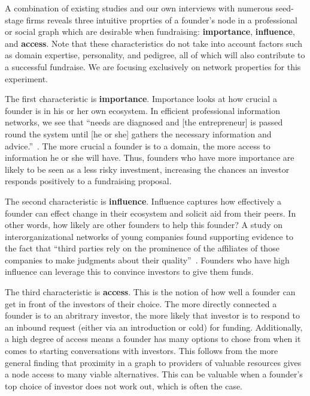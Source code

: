 A combination of existing studies and our own interviews with numerous seed-stage firms reveals three intuitive proprties of a founder's node in a professional or social graph which are desirable when fundraising: \textbf{importance}, \textbf{influence}, and \textbf{access}. Note that these characteristics do not take into account factors such as domain expertise, personality, and pedigree, all of which will also contribute to a successful fundraise. We are focusing exclusively on network properties for this experiment.

The first characteristic is \textbf{importance}. Importance looks at how crucial a founder is in his or her own ecosystem. In efficient professional information networks, we see that ``needs are diagnosed and [the entrepreneur] is passed round the system until [he or she] gathers the necessary information and advice.''~\cite{BIRLEY1985107}. The more crucial a founder is to a domain, the more access to information he or she will have. Thus, founders who have more importance are likely to be seen as a less risky investment, increasing the chances an investor responds positively to a fundraising proposal.

The second characteristic is \textbf{influence}. Influence captures how effectively a founder can effect change in their ecosystem and solicit aid from their peers. In other words, how likely are other founders to help this founder? A study on interorganizational networks of young companies found supporting evidence to the fact that ``third parties rely on the prominence of the affiliates of those companies to make judgments about their quality''~\cite{10.2307/2666998}. Founders who have high influence can leverage this to convince investors to give them funds.

The third characteristic is \textbf{access}. This is the notion of how well a founder can get in front of the investors of their choice. The more directly connected a founder is to an abritrary investor, the more likely that investor is to respond to an inbound request (either via an introduction or cold) for funding. Additionally, a high degree of access means a founder has many options to chose from when it comes to starting conversations with investors. This follows from the more general finding that proximity in a graph to providers of valuable resources gives a node access to many viable alternatives\cite{10.2307/3069443}. This can be valuable when a founder's top choice of investor does not work out, which is often the case.

